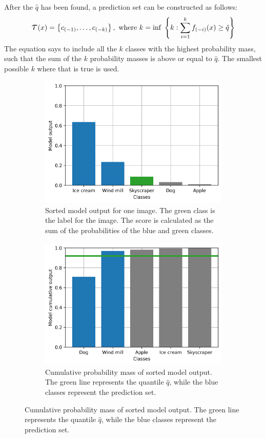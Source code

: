 After the $\hat{q}$ has been found, a prediction set can be constructed as follows:
\begin{align*}
    \Tau(x) = \left\{ c_{(-1)}, \ldots, c_{(-k)} \right\}, ~\text{where}~ k = \text{inf}~ \left\{k : \sum^{k}_{i=1} f_{(-i)}(x) \geq \hat{q} \right\}
\end{align*}
The equation says to include all the $k$ classes with the highest probability mass, such that the sum of the $k$ probability masses is above or equal to $\hat{q}$. The smallest possible $k$ where that is true is used.


\begin{figure}
    \centering
    \begin{subfigure}{0.44\textwidth}
        \includegraphics[width=\textwidth]{media/adaptive-prediction-sets-score.png}
        \caption{Sorted model output for one image. The green class is the label for the image. The score is calculated as the sum of the probabilities of the blue and green classes.}
    \end{subfigure}
    \hspace{1em}
    \begin{subfigure}{0.44\textwidth}
        \includegraphics[width=\textwidth]{media/adaptive-prediction-sets-prediction.png}
        \caption{Cumulative probability mass of sorted model output. The green line represents the quantile $\hat{q}$, while the blue classes represent the prediction set.}
    \end{subfigure}


\end{figure}
